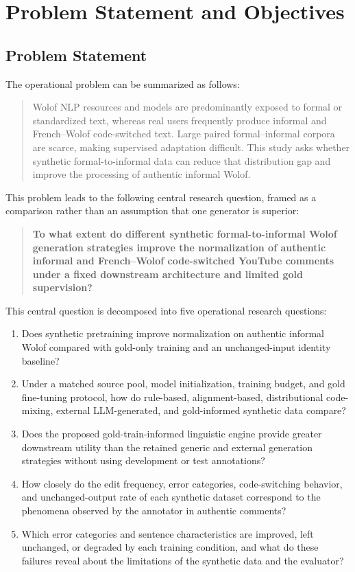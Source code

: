 \documentclass[12pt, a4paper, twoside, openany]{report}
\begin{document}
\medskip

\section{Problem Statement and Objectives}

\subsection{Problem Statement}

The operational problem can be summarized as follows:

\begin{quote}
	Wolof \ac{NLP} resources and models are predominantly exposed to formal or standardized text, whereas real users frequently produce informal and French--Wolof code-switched text. Large paired formal--informal corpora are scarce, making supervised adaptation difficult. This study asks whether synthetic formal-to-informal data can reduce that distribution gap and improve the processing of authentic informal Wolof.
\end{quote}

This problem leads to the following central research question, framed as a comparison rather than an assumption that one generator is superior:

\begin{quote}
	\textbf{To what extent do different synthetic formal-to-informal Wolof generation strategies improve the normalization of authentic informal and French--Wolof code-switched YouTube comments under a fixed downstream architecture and limited gold supervision?}
\end{quote}

This central question is decomposed into five operational research questions:

\begin{enumerate}[label=\textbf{RQ\arabic*:}, leftmargin=*]
	\item Does synthetic pretraining improve normalization on authentic informal Wolof compared with gold-only training and an unchanged-input identity baseline?
	\item Under a matched source pool, model initialization, training budget, and gold fine-tuning protocol, how do rule-based, alignment-based, distributional code-mixing, external LLM-generated, and gold-informed synthetic data compare?
	\item Does the proposed gold-train-informed linguistic engine provide greater downstream utility than the retained generic and external generation strategies without using development or test annotations?
	\item How closely do the edit frequency, error categories, code-switching behavior, and unchanged-output rate of each synthetic dataset correspond to the phenomena observed by the annotator in authentic comments?
	\item Which error categories and sentence characteristics are improved, left unchanged, or degraded by each training condition, and what do these failures reveal about the limitations of the synthetic data and the evaluator?
\end{enumerate}
\end{document}
